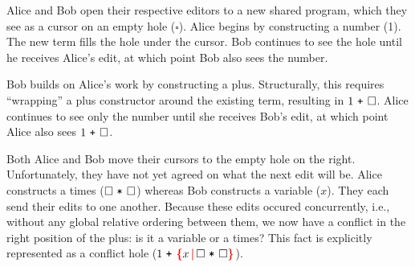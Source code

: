 \documentclass[nonacm, acmsmall, screen, review]{acmart}
\newcommand{\id}[1]{\textcolor{gray}{\ensuremath{#1}}}
\newcommand{\eid}[2]{{#2}^{\id{#1}}}
\newcommand{\ePlus}[3]{#2~\eid{#1}{\texttt{+}}~#3}
\newcommand{\eTimes}[3]{#2~\eid{#1}{\texttt{*}}~#3}
\newcommand{\hole}{\ensuremath{\square}} %
\newcommand{\conflictHole}[1]{%
{\noexpandarg\StrSubstitute{#1}{,}{\textcolor{red}{\,\textbf{|}\,}}[\myargs]%
{\textcolor{red}{\textbf{\{}}\myargs\textcolor{red}{\textbf{\}}}}}}%
\begin{document}
Alice and Bob open their respective editors to a new shared program,
which they see as a cursor on an empty hole ($\hole$).
Alice begins by constructing a number (1).
The new term fills the hole under the cursor.
Bob continues to see the hole until he receives Alice's edit,
at which point Bob also sees the number.

Bob builds on Alice's work by constructing a plus.
Structurally, this requires ``wrapping'' a plus constructor around the existing term, resulting in $\ePlus{}{1}{\hole}$.
Alice continues to see only the number until she receives Bob's edit,
at which point Alice also sees $\ePlus{}{1}{\hole}$.





Both Alice and Bob move their cursors to the empty hole on the right.
Unfortunately, they have not yet agreed on what the next edit will be.
Alice constructs a times ($\eTimes{}{\hole}{\hole}$) whereas Bob constructs a variable ($x$).
They each send their edits to one another.
Because these edits occured concurrently, i.e., without any global relative ordering between them, we now have a conflict in the right position of the plus: is it a variable or a times?
This fact is explicitly represented as a conflict hole ($\ePlus{}{1}{\conflictHole{x, \eTimes{}{\hole}{\hole}}}$).
\end{document}
